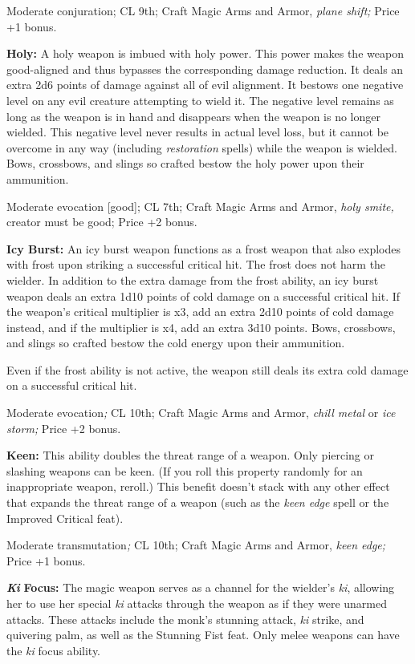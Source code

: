 Moderate conjuration; CL 9th; Craft Magic Arms and Armor, \textit{plane shift; 
}Price +1 bonus.

\textbf{Holy:} A holy weapon is imbued with holy power. This power makes the weapon 
good-aligned and thus bypasses the corresponding damage reduction. It deals an 
extra 2d6 points of damage against all of evil alignment. It bestows one negative 
level on any evil creature attempting to wield it. The negative level remains as 
long as the weapon is in hand and disappears when the weapon is no longer wielded. 
This negative level never results in actual level loss, but it cannot be overcome 
in any way (including \textit{restoration }spells) while the weapon is wielded. 
Bows, crossbows, and slings so crafted bestow the holy power upon their ammunition.

Moderate evocation [good]; CL 7th; Craft Magic Arms and Armor, \textit{holy smite, 
}creator must be good; Price +2 bonus.

\textbf{Icy Burst:} An icy burst weapon functions as a frost weapon that also explodes 
with frost upon striking a successful critical hit. The frost does not harm the 
wielder. In addition to the extra damage from the frost ability, an icy burst weapon 
deals an extra 1d10 points of cold damage on a successful critical hit. If the 
weapon's critical multiplier is x3, add an extra 2d10 points of cold damage instead, 
and if the multiplier is x4, add an extra 3d10 points. Bows, crossbows, and slings 
so crafted bestow the cold energy upon their ammunition. 

Even if the frost ability is not active, the weapon still deals its extra cold 
damage on a successful critical hit.

Moderate evocation\textit{; }CL 10th; Craft Magic Arms and Armor, \textit{chill 
metal }or \textit{ice storm; }Price +2 bonus.

\textbf{Keen:} This ability doubles the threat range of a weapon. Only piercing 
or slashing weapons can be keen. (If you roll this property randomly for an inappropriate 
weapon, reroll.) This benefit doesn't stack with any other effect that expands 
the threat range of a weapon (such as the \textit{keen edge }spell or the Improved 
Critical feat).

Moderate transmutation\textit{; }CL 10th; Craft Magic Arms and Armor, \textit{keen 
edge; }Price +1 bonus.

\textit{\textbf{Ki }}\textbf{Focus:} The magic weapon serves as a channel for the 
wielder's \textit{ki}, allowing her to use her special \textit{ki }attacks through 
the weapon as if they were unarmed attacks. These attacks include the monk's stunning 
attack, \textit{ki }strike, and quivering palm, as well as the Stunning Fist feat. 
Only melee weapons can have the \textit{ki }focus ability.

